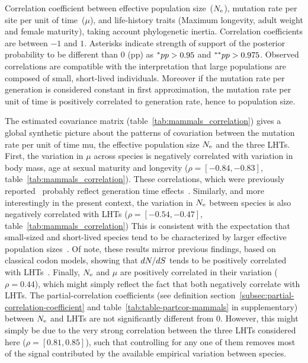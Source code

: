 \begin{table}[htbp]
    
    \caption[Traits correlation in mammals]{
    Correlation coefficient between effective population size~($N_{\text{e}}$), mutation rate per site per unit of time~($\mu$), and life-history traits (Maximum longevity, adult weight and female maturity), taking account phylogenetic inertia.
    Correlation coefficients are between $-1$ and $1$.
    Asterisks indicate strength of support of the posterior probability to be different than $0$ (pp) as $\smash{^{*}} pp > 0.95$ and $\smash{^{**}} pp > 0.975$.
    Observed correlations are compatible with the interpretation that large populations are composed of small, short-lived individuals.
    Moreover if the mutation rate per generation is considered constant in first approximation, the mutation rate per unit of time is positively correlated to generation rate, hence to population size.
    }
    \label{tab:mammals_correlation}
\end{table}

The estimated covariance matrix (table~\ref{tab:mammals_correlation}) gives a global synthetic picture about the patterns of covariation between the mutation rate per unit of time mu, the effective population size $N_{\text{e}}$ and the three LHTs.
First, the variation in $\mu$ across species is negatively correlated with variation in body mass, age at sexual maturity and longevity ($\rho=[-0.84, -0.83]$, table~\ref{tab:mammals_correlation}).
These correlations, which were previously reported~\citep{Lartillot2012,Nabholz2013} probably reflect generation time effects~\citep{Amster2016}.
Similarly, and more interestingly in the present context, the variation in $N_{\text{e}}$ between species is also negatively correlated with LHTs ($\rho=[-0.54, -0.47]$, table~\ref{tab:mammals_correlation})
This is consistent with the expectation that small-sized and short-lived species tend to be characterized by larger effective population sizes~\citep{Romiguier2014}.
Of note, these results mirror previous findings, based on classical codon models, showing that $dN/dS$ tends to be positively correlated with LHTs~\citep{Lartillot2012,Nabholz2013,Figuet2017}.
Finally, $N_{\text{e}}$ and $\mu$ are positively correlated in their variation ($\rho = 0.44$), which might simply reflect the fact that both negatively correlate with LHTs.
The partial-correlation coefficients (see definition section~\ref{subsec:partial-correlation-coefficient} and table~\ref{tab:table-partcor-mammals} in supplementary) between $N_{\text{e}}$ and LHTs are not significantly different from 0.
However, this might simply be due to the very strong correlation between the three LHTs considered here ($\rho=[0.81, 0.85]$), such that controlling for any one of them removes most of the signal contributed by the available empirical variation between species.

